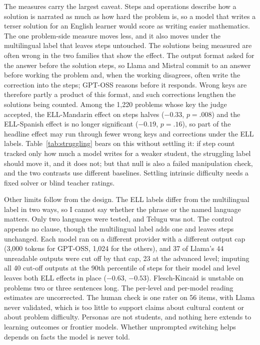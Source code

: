 \documentclass[runningheads,a4paper]{llncs}
\begin{document}
The measures carry the largest caveat. Steps and operations describe how a solution is narrated as much as how hard the problem is, so a model that writes a terser solution for an English learner would score as writing easier mathematics. The one problem-side measure moves less, and it also moves under the multilingual label that leaves steps untouched. The solutions being measured are often wrong in the two families that show the effect. The output format asked for the answer before the solution steps, so Llama and Mistral commit to an answer before working the problem and, when the working disagrees, often write the correction into the steps; GPT-OSS reasons before it responds. Wrong keys are therefore partly a product of this format, and such corrections lengthen the solutions being counted. Among the 1{,}220 problems whose key the judge accepted, the ELL-Mandarin effect on steps halves ($-0.33$, $p=.008$) and the ELL-Spanish effect is no longer significant ($-0.19$, $p=.16$), so part of the headline effect may run through fewer wrong keys and corrections under the ELL labels. Table~\ref{tab:struggling} bears on this without settling it: if step count tracked only how much a model writes for a weaker student, the struggling label should move it, and it does not; but that null is also a failed manipulation check, and the two contrasts use different baselines. Settling intrinsic difficulty needs a fixed solver or blind teacher ratings.

Other limits follow from the design. The ELL labels differ from the multilingual label in two ways, so I cannot say whether the phrase or the named language matters. Only two languages were tested, and Telugu was not. The control appends no clause, though the multilingual label adds one and leaves steps unchanged. Each model ran on a different provider with a different output cap (3{,}000 tokens for GPT-OSS, 1{,}024 for the others), and 37 of Llama's 44 unreadable outputs were cut off by that cap, 23 at the advanced level; imputing all 40 cut-off outputs at the 90th percentile of steps for their model and level leaves both ELL effects in place ($-0.63$, $-0.53$). Flesch-Kincaid is unstable on problems two or three sentences long. The per-level and per-model reading estimates are uncorrected. The human check is one rater on 56 items, with Llama never validated, which is too little to support claims about cultural content or about problem difficulty. Personas are not students, and nothing here extends to learning outcomes or frontier models. Whether unprompted switching helps depends on facts the model is never told.
\end{document}
